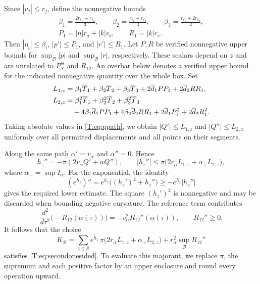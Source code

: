 \documentclass[reqno,english]{amsart}
\theoremstyle{definition}
\newtheorem{open problem}[theorem]{Open Problem}
\theoremstyle{remark}
\theoremstyle{plain}
\numberwithin{equation}{section}
\begin{document}
Since $|v_j|\le r_j$, define the nonnegative bounds
\[
 \begin{gathered}
 \beta_1=\frac{2r_{\ell_1}+r_{\ell_2}}3,\qquad
 \beta_2=\frac{r_{\ell_1}+r_{\ell_2}}3,\qquad
 \beta_3=\frac{r_{\ell_1}+2r_{\ell_2}}3,\\
 P_1=|n|r_a+|k|r_b,\qquad R_1=|k|r_c.
 \end{gathered}
\]
Then $|\eta_i|\le\beta_i$, $|p'|\le P_1$, and $|r'|\le R_1$.
Let $P,R$ be verified nonnegative upper bounds for
$\sup_{\mathcal B}|p|$ and $\sup_{\mathcal B}|r|$, respectively.
These scalars depend on $z$ and are unrelated to
$P^{\Theta}_{\mathcal S}$ and $R_{12}$. An overbar below denotes a
verified upper bound for the indicated nonnegative quantity over the
whole box. Set
\begin{align}\label{T:eq:L1L2}
 L_{1,z}&=\beta_1\overline T_1+\beta_2\overline T_2
          +\beta_3\overline T_3
          +2\overline d_1PP_1+2\overline d_2RR_1,\notag\\
 L_{2,z}&=\beta_1^2\overline T_1+\beta_2^2\overline T_2
          +\beta_3^2\overline T_3\\
 &\quad+4\beta_1\overline d_1PP_1+4\beta_2\overline d_2RR_1
          +2\overline d_1P_1^2+2\overline d_2R_1^2.\notag
\end{align}
Taking absolute values in \eqref{T:eq:qpath}, we obtain
$|Q'|\le L_{1,z}$ and $|Q''|\le L_{2,z}$ uniformly over all
permitted displacements and all points on their segments.

Along the same path $\alpha'=v_\alpha$ and $\alpha''=0$. Hence
\[
 h_z''=-\pi(2v_\alpha Q'+\alpha Q''),\qquad
 |h_z''|\le\pi\bigl(2r_\alpha L_{1,z}
                         +\alpha_+L_{2,z}\bigr),
\]
where $\alpha_+=\sup I_\alpha$. For the exponential, the identity
\[
 (e^{h_z})''
 =e^{h_z}\bigl((h_z')^2+h_z''\bigr)
 \ge-e^{h_z}|h_z''|
\]
gives the required lower estimate. The square $(h_z')^2$ is
nonnegative and may be discarded when bounding negative curvature.
The reference term contributes
\[
 \frac{d^2}{d\tau^2}\bigl(-R_{12}(\alpha(\tau))\bigr)
 =-v_\alpha^2R_{12}''(\alpha(\tau)),
 \qquad R_{12}''\ge0.
\]
It follows that the choice
\begin{equation}\label{T:eq:Kbox}
 K_{\mathcal B}
 =\sum_{z\in\mathcal S}\overline{e^{h_z}}\,
       \pi\bigl(2r_\alpha L_{1,z}+\alpha_+L_{2,z}\bigr)
       +r_\alpha^2\sup_{\mathcal B}R_{12}''
\end{equation}
satisfies \eqref{T:eq:secondonesided}. To evaluate this majorant,
we replace $\pi$, the supremum and each positive factor by an upper
enclosure and round every operation upward.
\end{document}
